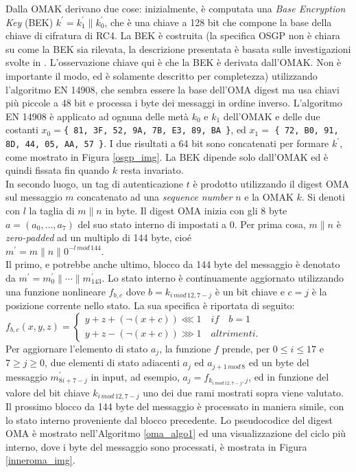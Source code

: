Dalla OMAK derivano due cose: inizialmente, è computata una \emph{Base Encryption Key} (BEK) $k^\prime =  k^{\prime}_{1} \| k^{\prime}_{0}$, che è una chiave a 128 bit che compone la base della chiave di cifratura di RC4. La BEK è costruita (la specifica OSGP non è chiara su come la BEK sia rilevata, la descrizione presentata è basata sulle investigazioni svolte in \cite{dumbcrypto}. L'osservazione chiave qui è che la BEK è derivata dall'OMAK. Non è importante il modo, ed è solamente descritto per completezza) utilizzando l'algoritmo EN 14908, che sembra essere la base dell'OMA digest ma usa chiavi più piccole a 48 bit e processa i byte dei messaggi in ordine inverso. L'algoritmo EN 14908 è applicato ad ognuna delle metà $k_0$ e $k_1$ dell'OMAK e delle due costanti $x_0 = ${\tt \{ 81, 3F, 52, 9A, 7B, E3, 89, BA \}}, ed $x_1 = $ {\tt \{ 72, B0, 91, 8D, 44, 05, AA, 57 \}}. I due risultati a 64 bit sono concatenati per formare $k^{\prime}$, come mostrato in Figura \ref{osgp_img}. La BEK dipende solo dall'OMAK ed è quindi fissata fin quando $k$ resta invariato.\\
In secondo luogo, un tag di autenticazione $t$ è prodotto utilizzando il digest OMA sul messaggio $m$ concatenato ad una \emph{sequence number} $n$ e la OMAK $k$. Si denoti con $l$ la taglia di $m\|n$ in byte. Il digest OMA inizia con gli 8 byte $a = (a_0, \ldots, a_7)$ del suo stato interno di impostati a 0. Per prima cosa, $m\|n$ è \emph{zero-padded} ad un multiplo di 144 byte, cioé\\
\indent $m^\prime = m \| n \| 0^{-l\, mod\, 144}$.\\
Il primo, e potrebbe anche ultimo, blocco da 144 byte del messaggio è denotato da $m^\prime = m^\prime_0 \| \cdots \| m^\prime_{143}$. Lo stato interno è continuamente aggiornato utilizzando una funzione nonlineare $f_{b,c}$ dove $b = k_{i\, mod\, 12, 7-j}$ è un bit chiave e $c = j$ è la posizione corrente nello stato. La sua specifica è riportata di seguito:\\
\indent   $f_{b,c}(x,y,z)=
\begin{cases}
	y + z + (\neg(x + c)) \lll 1\quad if\quad b=1\\
	y + z - (\neg(x + c)) \ggg 1\quad altrimenti.
\end{cases}$\\
Per aggiornare l'elemento di stato $a_j$, la funzione $f$ prende, per $0 \leq i \leq 17$ e $7 \geq j \geq 0$, due elementi di stato adiacenti $a_j$ ed $a_{j+1\, mod\, 8}$ ed un byte del messaggio $m^\prime_{8i+7-j}$ in input, ad esempio, $a_j = f_{k_{i\,mod\,12,7-j},j}$, ed in funzione del valore del bit chiave $k_{i\,mod\,12,7-j}$ uno dei due rami mostrati sopra viene valutato. Il prossimo blocco da 144 byte del messaggio è processato in maniera simile, con lo stato interno proveniente dal blocco precedente. Lo pseudocodice del digest OMA è mostrato nell'Algoritmo \ref{oma_algo1} ed una visualizzazione del ciclo più interno, dove i byte del messaggio sono processati, è mostrata in Figura \ref{inneroma_img}.
